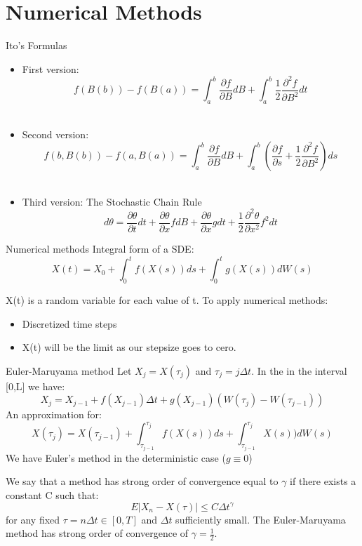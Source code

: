 
\section{Numerical Methods}

\begin{frame}{Ito's Formulas}
  	\begin{itemize}
   		\item First version: $$f(B(b))-f(B(a))=\int_{a}^{b}{\frac{\partial f}{\partial B} 				dB}+\int_{a}^{b}{\frac{1}{2} \frac{\partial^2 f}{\partial B^2} dt} $$\\
    		\item Second version: $$f(b,B(b))-f(a,B(a))=\int_{a}^{b}{\frac{\partial f}{\partial B} 			dB}+\int_{a}^{b}{(\frac{\partial f}{\partial s}+\frac{1}{2}\frac{\partial ^2 f}{\partial 		B^2}) ds}$$\\
  		\item  Third version: The Stochastic Chain Rule $$d\theta=\frac{\partial\theta}{\partial 		t}dt+\frac{\partial\theta}{\partial x}f dB+\frac{\partial\theta}{\partial x}g 					dt+\frac{1}{2}\frac{\partial^2\theta}{\partial x^2}f^2dt$$
  	\end{itemize}
\end{frame}

\begin{frame}{Numerical methods}
Integral form of a SDE: 
$$X(t)=X_0+\int_{0}^{t}f(X(s))ds+\int_{0}^{t}g(X(s))dW(s)$$

X(t) is a random variable for each value of t. To apply numerical methods:
	\begin{itemize}
		\item Discretized time steps	
		\item X(t) will be the limit as our stepsize goes to cero.
	\end{itemize}
\end{frame}

\begin{frame}{Euler-Maruyama method}
Let $X_j=X(\tau_j)$ and $\tau_j=j\Delta t$. In the in the interval [0,L] we have:\\
$$X_j=X_{j-1}+f(X_{j-1})\Delta t+g(X_{j-1})(W(\tau_j)-W(\tau_{j-1}))$$
An approximation for:
$$X(\tau_j)=X(\tau_{j-1})+\int_{\tau_{j-1}}^{\tau_{j}}f(X(s))ds+\int_
{\tau_{j-1}}^{\tau_{j}}X(s))dW(s)$$
We have Euler's method in the deterministic case ($g\equiv 0$)
\end{frame}

\begin{frame}
We say that a method has strong order of convergence equal to $\gamma$ if there exists a constant C such that:
$$E|X_n-X(\tau)|\leq C \Delta t^\gamma$$
for any fixed $\tau=n \Delta t \in [0,T]$ and $\Delta t$ sufficiently small.
\bigskip
The Euler-Maruyama method has strong order of convergence of $\gamma=\frac{1}{2}$.
\end{frame}

